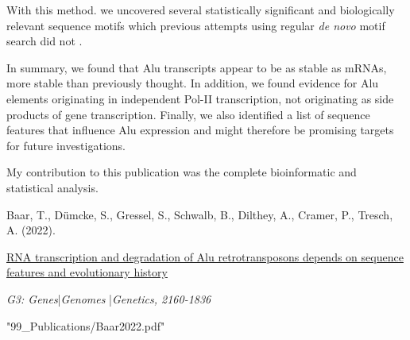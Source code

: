 With this method. we uncovered several statistically significant and
biologically relevant sequence motifs which previous attempts using regular
\textit{de novo} motif search did not \citep{Zhang2019}.
\bigbreak

\noindent In summary, we found that Alu transcripts appear to be as stable as
mRNAs, more stable than previously thought. In addition, we found evidence for
Alu elements originating in independent Pol-II transcription, not originating
as side products of gene transcription. Finally, we also identified a list of
sequence features that influence Alu expression and might therefore be
promising targets for future investigations.
\pagebreak


\null
\vfill
\noindent My contribution to this publication was the complete bioinformatic
and statistical analysis.\nopagebreak
\medskip
\begin{tcolorbox}[
  boxrule=0pt, leftrule=1pt, colframe=s-blue, colback=white, sharp corners=all]%
  \raggedright
  Baar, T., Dümcke, S., Gressel, S., Schwalb, B.,
  Dilthey, A., Cramer, P., Tresch, A. (2022).
  
  \smallskip
  \href{https://doi.org/10.1093/g3journal/jkac054}
    {RNA transcription and degradation of Alu retrotransposons depends on
    sequence features and evolutionary history}

  \smallskip
  \textit{G3: Genes}\thinspace{}|\thinspace{}\textit{Genomes}%
    \thinspace{}|\thinspace{}\textit{Genetics, 2160-1836}
\end{tcolorbox}



  {"99_Publications/Baar2022.pdf"}


\null
\thispagestyle{empty}
\newpage